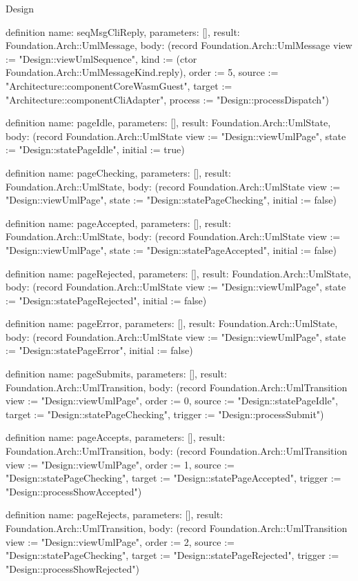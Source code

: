 \begin{lexlean}{Design}
\begin{semanticmodule}
definition{
  name: seqMsgCliReply,
  parameters: [],
  result: Foundation.Arch::UmlMessage,
  body: (record Foundation.Arch::UmlMessage {view := "Design::viewUmlSequence", kind := (ctor Foundation.Arch::UmlMessageKind.reply), order := 5, source := "Architecture::componentCoreWasmGuest", target := "Architecture::componentCliAdapter", process := "Design::processDispatch"})
}

definition{
  name: pageIdle,
  parameters: [],
  result: Foundation.Arch::UmlState,
  body: (record Foundation.Arch::UmlState {view := "Design::viewUmlPage", state := "Design::statePageIdle", initial := true})
}

definition{
  name: pageChecking,
  parameters: [],
  result: Foundation.Arch::UmlState,
  body: (record Foundation.Arch::UmlState {view := "Design::viewUmlPage", state := "Design::statePageChecking", initial := false})
}

definition{
  name: pageAccepted,
  parameters: [],
  result: Foundation.Arch::UmlState,
  body: (record Foundation.Arch::UmlState {view := "Design::viewUmlPage", state := "Design::statePageAccepted", initial := false})
}

definition{
  name: pageRejected,
  parameters: [],
  result: Foundation.Arch::UmlState,
  body: (record Foundation.Arch::UmlState {view := "Design::viewUmlPage", state := "Design::statePageRejected", initial := false})
}

definition{
  name: pageError,
  parameters: [],
  result: Foundation.Arch::UmlState,
  body: (record Foundation.Arch::UmlState {view := "Design::viewUmlPage", state := "Design::statePageError", initial := false})
}

definition{
  name: pageSubmits,
  parameters: [],
  result: Foundation.Arch::UmlTransition,
  body: (record Foundation.Arch::UmlTransition {view := "Design::viewUmlPage", order := 0, source := "Design::statePageIdle", target := "Design::statePageChecking", trigger := "Design::processSubmit"})
}

definition{
  name: pageAccepts,
  parameters: [],
  result: Foundation.Arch::UmlTransition,
  body: (record Foundation.Arch::UmlTransition {view := "Design::viewUmlPage", order := 1, source := "Design::statePageChecking", target := "Design::statePageAccepted", trigger := "Design::processShowAccepted"})
}

definition{
  name: pageRejects,
  parameters: [],
  result: Foundation.Arch::UmlTransition,
  body: (record Foundation.Arch::UmlTransition {view := "Design::viewUmlPage", order := 2, source := "Design::statePageChecking", target := "Design::statePageRejected", trigger := "Design::processShowRejected"})
}


\end{semanticmodule}
\end{lexlean}
